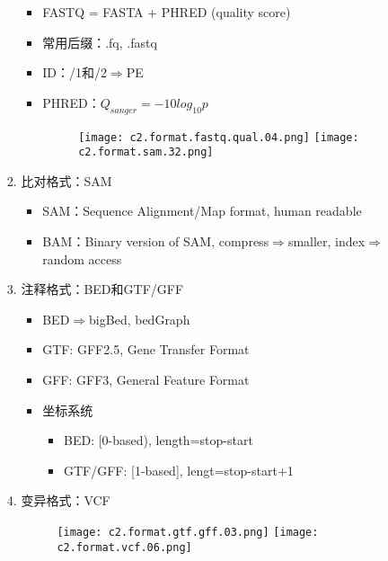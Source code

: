 \documentclass{TIJMUjiaoanLL}
\begin{document}
\begin{enumerate}
\begin{enumerate}
\begin{enumerate}
\begin{itemize}
              \item FASTQ = FASTA + PHRED (quality score)
              \item 常用后缀：.fq, .fastq
              \item ID：/1和/2$\Rightarrow$PE
              \item PHRED：$Q_{sanger} = -10log_{10}p$
            \vspace{-0.5em}
            \begin{figure}[h]
              \centering
              \texttt{[image: c2.format.fastq.qual.04.png]}
              \quad
              \texttt{[image: c2.format.sam.32.png]}
            \end{figure}
            \vspace{-0.5em}
            \end{itemize}
          \item 比对格式：SAM
            \begin{itemize}
              \item SAM：Sequence Alignment/Map format, human readable
              \item BAM：Binary version of SAM, compress$\Rightarrow$smaller, index$\Rightarrow$random access
            \end{itemize}
          \item 注释格式：BED和GTF/GFF
            \begin{itemize}
              \item BED$\Rightarrow$bigBed, bedGraph
              \item GTF: GFF2.5, Gene Transfer Format
              \item GFF: GFF3, General Feature Format
              \item 坐标系统
                \begin{itemize}
                  \item BED: [0-based), length=stop-start
                  \item GTF/GFF: [1-based], lengt=stop-start+1
                \end{itemize}
            \end{itemize}

\otherTail
\newpage
\otherHeader

          \item 变异格式：VCF
            \vspace{-0.5em}
            \begin{figure}[h]
              \centering
              \texttt{[image: c2.format.gtf.gff.03.png]}
              \quad
              \texttt{[image: c2.format.vcf.06.png]}
            \end{figure}
            \vspace{-0.5em}
        \end{enumerate}
    \end{enumerate}


\end{enumerate}
\end{document}
